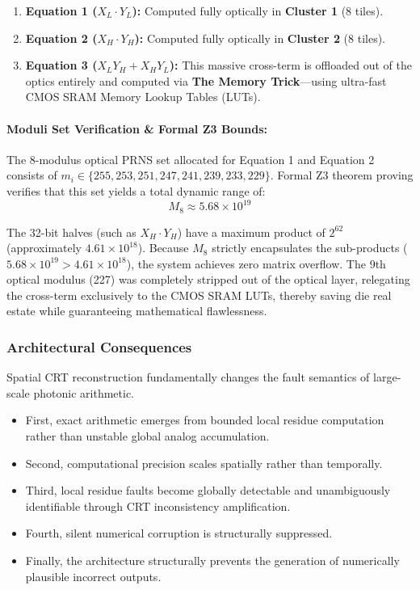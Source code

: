 \documentclass[journal]{IEEEtran}
\begin{document}
\begin{enumerate}
\item \textbf{Equation 1 ($X_L \cdot Y_L$):} Computed fully optically in \textbf{Cluster 1} (8 tiles).
\item \textbf{Equation 2 ($X_H \cdot Y_H$):} Computed fully optically in \textbf{Cluster 2} (8 tiles).
\item \textbf{Equation 3 ($X_L Y_H + X_H Y_L$):} This massive cross-term is offloaded out of the optics entirely and computed via \textbf{The Memory Trick}---using ultra-fast CMOS SRAM Memory Lookup Tables (LUTs).
\end{enumerate}

\paragraph{\textbf{Moduli Set Verification \& Formal Z3 Bounds:}}
The 8-modulus optical PRNS set allocated for Equation 1 and Equation 2 consists of $m_i \in \{255, 253, 251, 247, 241, 239, 233, 229\}$. Formal Z3 theorem proving verifies that this set yields a total dynamic range of:
\begin{equation}
M_8 \approx 5.68 \times 10^{19}
\end{equation}

The 32-bit halves (such as $X_H \cdot Y_H$) have a maximum product of $2^{62}$ (approximately $4.61 \times 10^{18}$). 
Because $M_8$ strictly encapsulates the sub-products ($5.68 \times 10^{19} > 4.61 \times 10^{18}$), the system achieves zero matrix overflow. The 9th optical modulus (227) was completely stripped out of the optical layer, relegating the cross-term exclusively to the CMOS SRAM LUTs, thereby saving die real estate while guaranteeing mathematical flawlessness.
\subsubsection{\textbf{Architectural Consequences}}

Spatial CRT reconstruction fundamentally changes the fault semantics of large-scale photonic arithmetic.

\begin{itemize}
\item  First, exact arithmetic emerges from bounded local residue computation rather than unstable global analog accumulation.
\item  Second, computational precision scales spatially rather than temporally.
\item  Third, local residue faults become globally detectable and unambiguously identifiable through CRT inconsistency amplification.
\item  Fourth, silent numerical corruption is structurally suppressed.
\item  Finally, the architecture structurally prevents the generation of numerically plausible incorrect outputs.
\end{itemize}
\end{document}
